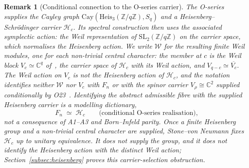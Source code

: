 \documentclass[11pt,a4paper]{article}
\newtheorem{remark}[theorem]{Remark}
\begin{document}
    \begin{remark}[Conditional connection to the O-series carrier]
      \label{rem:fn-vrho}
      The O-series supplies the Cayley graph
      $\mathrm{Cay}(\mathrm{Heis}_3(\mathbb{Z}/q\mathbb{Z}),S_q)$ and a
      Heisenberg--Schr\"odinger carrier $\mathcal{H}_c$.
      Its spectral construction then uses the associated symplectic action: the Weil representation of
      $\mathrm{SL}_2(\mathbb{Z}/q\mathbb{Z})$ on the carrier space, which normalises the Heisenberg action.
      We write $\mathcal{W}$ for the resulting finite Weil modules, one for each non-trivial central character:
      the member at $c$ is the Weil block $V_c \simeq \mathbb{C}^q$ of~\cite{Beau2026a31}, the carrier space of
      $\mathcal{H}_c$ with its Weil action, and $V_{q-c} \simeq \overline{V_c}$.
      The Weil action on $V_c$ is not the Heisenberg action of $\mathcal{H}_c$, and the notation identifies
      neither $\mathcal{W}$ nor $V_c$ with $F_n$ or with the spinor carrier $V_\rho \cong \mathbb{C}^2$ supplied
      conditionally by O23~\cite{Beau2026a27}.
      Identifying the abstract admissible fibre with the supplied Heisenberg
      carrier is a modelling dictionary,
      \begin{equation}
        F_n \;\simeq\; \mathcal{H}_c
        \qquad\text{(conditional O-series realisation),}
      \end{equation}
      not a consequence of A1--A3 and Born--Infeld parity.
      Once a finite Heisenberg group and a non-trivial central character are
      supplied, Stone--von Neumann fixes $\mathcal{H}_c$ up to unitary
      equivalence.
      It does not supply the group, and it does not identify the Heisenberg action
      with the distinct Weil action; Section~\ref{subsec:heisenberg} proves this
      carrier-selection obstruction.
    \end{remark}
\end{document}
